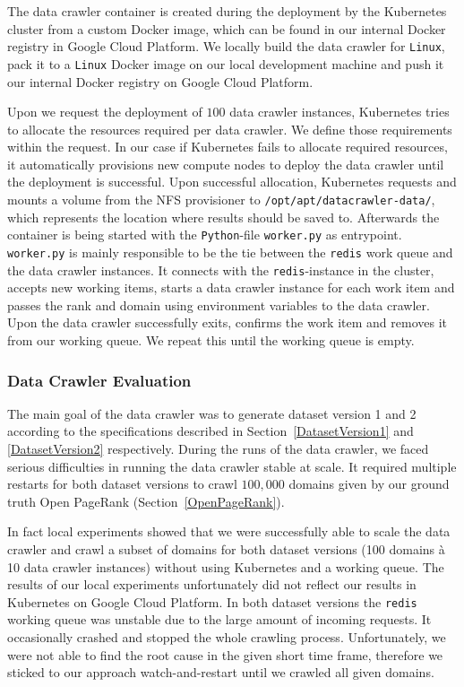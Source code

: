 The data crawler container is created during the deployment by the Kubernetes cluster from a custom Docker image, which can be found in our internal Docker registry in Google Cloud Platform. We locally build the data crawler for \texttt{Linux}, pack it to a \texttt{Linux} Docker image on our local development machine and push it our internal Docker registry on Google Cloud Platform. 

Upon we request the deployment of $100$ data crawler instances, Kubernetes tries to allocate the resources required per data crawler. We define those requirements within the request. In our case if Kubernetes fails to allocate required resources, it automatically provisions new compute nodes to deploy the data crawler until the deployment is successful. Upon successful allocation, Kubernetes requests and mounts a volume from the NFS provisioner to \texttt{/opt/apt/datacrawler-data/}, which represents the location where results should be saved to. Afterwards the container is being started with the \texttt{Python}-file \texttt{worker.py} as entrypoint. \texttt{worker.py} is mainly responsible to be the tie between the \texttt{redis} work queue and the data crawler instances. It connects with the \texttt{redis}-instance in the cluster, accepts new working items, starts a data crawler instance for each work item and passes the rank and domain using environment variables to the data crawler. Upon the data crawler successfully exits, confirms the work item and removes it from our working queue. We repeat this until the working queue is empty.

\subsubsection{Data Crawler Evaluation}
\label{datacrawler_results}
The main goal of the data crawler was to generate dataset version 1 and 2 according to the specifications described in Section~\ref{DatasetVersion1} and \ref{DatasetVersion2} respectively. During the runs of the data crawler, we faced serious difficulties in running the data crawler stable at scale. It required multiple restarts for both dataset versions to crawl $100,000$ domains given by our ground truth Open PageRank (Section~\ref{OpenPageRank}).

In fact local experiments showed that we were successfully able to scale the data crawler and crawl a subset of domains for both dataset versions (100 domains à 10 data crawler instances) without using Kubernetes and a working queue. The results of our local experiments unfortunately did not reflect our results in Kubernetes on Google Cloud Platform. In both dataset versions the \texttt{redis} working queue was unstable due to the large amount of incoming requests. It occasionally crashed and stopped the whole crawling process. Unfortunately, we were not able to find the root cause in the given short time frame, therefore we sticked to our approach watch-and-restart until we crawled all given domains.


